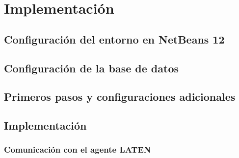 \chapter{Implementación}

\section{Configuración del entorno en NetBeans 12}

\section{Configuración de la base de datos}

\section{Primeros pasos y configuraciones adicionales}

\section{Implementación}

\subsection{Comunicación con el agente LATEN}